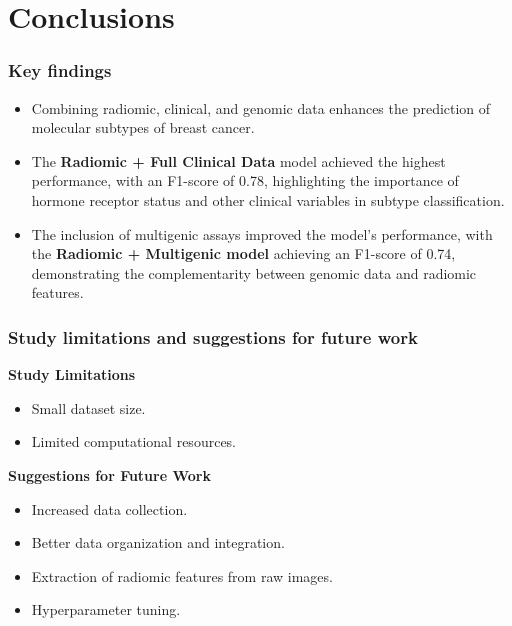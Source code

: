 \section{Conclusions}


\begin{frame}
    \frametitle{Key findings}
    \vspace{3mm}

    \begin{itemize}
        \item Combining radiomic, clinical, and genomic data enhances the prediction of molecular subtypes of breast cancer.
	\vspace{4mm}
        \item The \textbf{Radiomic + Full Clinical Data} model achieved the highest performance, with an F1-score of 0.78, highlighting the importance of hormone receptor status and other clinical variables in subtype classification.
	\vspace{4mm}
        \item The inclusion of multigenic assays improved the model’s performance, with the \textbf{Radiomic + Multigenic model} achieving an F1-score of 0.74, demonstrating the complementarity between genomic data and radiomic features.
    \end{itemize}

    \vfill 
\end{frame}


\begin{frame}
    \frametitle{Study limitations and suggestions for future work}
    \vspace{3mm}

        \textbf{Study Limitations}
 	\vspace{2mm}
        \begin{itemize}
            \item Small dataset size.
            \item Limited computational resources.
        \end{itemize}

 	\vspace{5mm}

        \textbf{Suggestions for Future Work}
 	\vspace{2mm}
        \begin{itemize}
            \item Increased data collection.
            \item Better data organization and integration.
            \item Extraction of radiomic features from raw images.
            \item Hyperparameter tuning.
        \end{itemize}

    \vfill 
\end{frame}